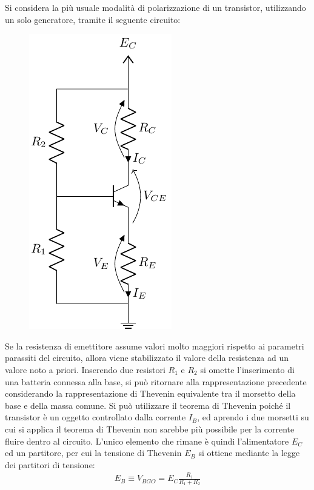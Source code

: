 \documentclass{article}
\numberwithin{equation}{subsection}
\begin{document}
Si considera la più usuale modalità di polarizzazione di un transistor, utilizzando un solo generatore, tramite il seguente circuito:
\begin{figure}[H]%
    \centering
    \includegraphics{bjt-polarizzazione.pdf}%
    \label{fig:bjt-polarizzazione}
\end{figure}
Se la resistenza di emettitore assume valori molto maggiori rispetto ai parametri parassiti del circuito, allora viene stabilizzato il valore della resistenza
ad un valore noto a priori. Inserendo due resistori $R_1$ e $R_2$ si omette l'inserimento di una batteria connessa alla base, si può ritornare alla 
rappresentazione precedente considerando la rappresentazione di Thevenin equivalente tra il morsetto della base e della massa comune. Si può 
utilizzare il teorema di Thevenin poiché il transistor è un oggetto controllato dalla corrente $I_B$, ed aprendo i due morsetti su cui si applica 
il teorema di Thevenin non sarebbe più possibile per la corrente fluire dentro al circuito. L'unico elemento che rimane è quindi l'alimentatore $E_C$ 
ed un partitore, per cui la tensione di Thevenin $E_B$ si ottiene mediante la legge dei partitori di tensione:
\begin{gather*}
    E_B\equiv V_{BGO}=E_C\displaystyle\frac{R_1}{R_1+R_2}
\end{gather*} 
\end{document}
